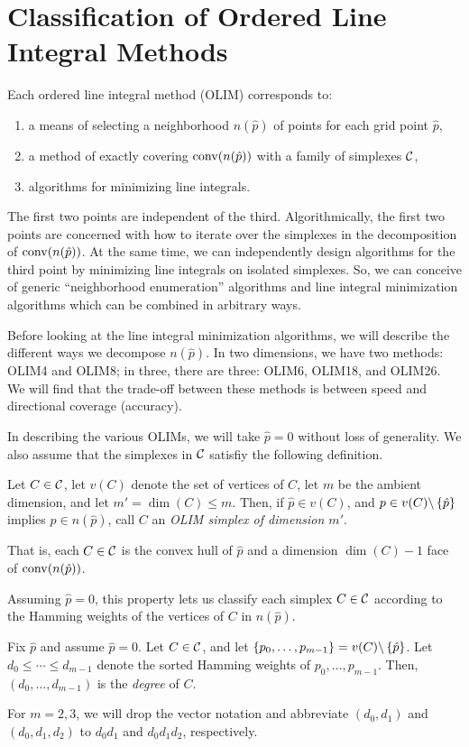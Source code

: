\documentclass{article}
\begin{document}
\large

\section{Classification of Ordered Line Integral Methods}

Each ordered line integral method (OLIM) corresponds to:
\begin{enumerate}
\item a means of selecting a neighborhood $n(\hat{p})$ of points for
  each grid point $\hat{p}$,
\item a method of exactly covering $\operatorname{conv}(n(\hat{p}))$ with a family
  of simplexes $\mathcal{C}$,
\item algorithms for minimizing line integrals.
\end{enumerate}
The first two points are independent of the third. Algorithmically,
the first two points are concerned with how to iterate over the
simplexes in the decomposition of $\operatorname{conv}(n(\hat{p}))$. At the same
time, we can independently design algorithms for the third point by
minimizing line integrals on isolated simplexes. So, we can conceive
of generic ``neighborhood enumeration'' algorithms and line integral
minimization algorithms which can be combined in arbitrary ways.

Before looking at the line integral minimization algorithms, we will
describe the different ways we decompose $n(\hat{p})$. In two
dimensions, we have two methods: OLIM4 and OLIM8; in three, there are
three: OLIM6, OLIM18, and OLIM26. We will find that the trade-off
between these methods is between speed and directional coverage
(accuracy).

In describing the various OLIMs, we will take $\hat{p} = 0$ without
loss of generality. We also assume that the simplexes in $\mathcal{C}$
satisfiy the following definition.
\begin{defn}\label{def:olim-simplex}
  Let $C \in \mathcal{C}$, let $v(C)$ denote the set of vertices of $C$, let
  $m$ be the ambient dimension, and let $m' = \dim(C) \leq m$. Then,
  if $\hat{p} \in v(C)$, and $p \in v(C) \backslash \left\{\hat{p}\right\}$
  implies $p \in n(\hat{p})$, call $C$ an \emph{OLIM simplex of
    dimension $m'$}.
\end{defn}
\noindent That is, each $C \in \mathcal{C}$ is the convex hull of $\hat{p}$
and a dimension $\dim(C) - 1$ face of $\operatorname{conv}(n(\hat{p}))$.

Assuming $\hat{p} = 0$, this property lets us classify each simplex
$C \in \mathcal{C}$ according to the Hamming weights of the vertices of $C$
in $n(\hat{p})$.
\begin{defn}
  Fix $\hat{p}$ and assume $\hat{p} = 0$. Let $C \in \mathcal{C}$, and let
  $\left\{p_0, \hdots, p_{m-1}\right\} = v(C) \backslash \left\{\hat{p}\right\}$. Let
  $d_0 \leq \cdots \leq d_{m-1}$ denote the sorted Hamming weights of
  $p_0, \hdots, p_{m-1}$. Then, $(d_0, \hdots, d_{m-1})$ is the
  \emph{degree} of $C$.
\end{defn}
\noindent For $m = 2, 3$, we will drop the vector notation and abbreviate
$(d_0, d_1)$ and $(d_0, d_1, d_2)$ to $d_0d_1$ and $d_0d_1d_2$,
respectively.
\end{document}
